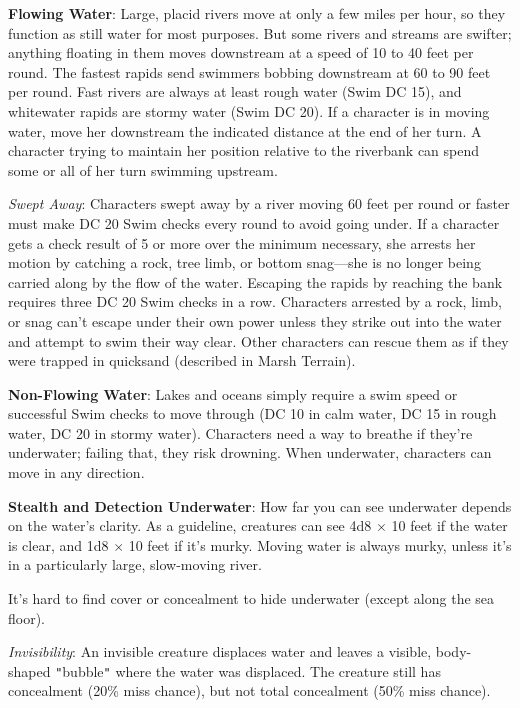 \textbf{Flowing Water}: Large, placid rivers move at only a few miles per hour, so they function as still water for most purposes. But some rivers and streams are swifter; anything floating in them moves downstream at a speed of 10 to 40 feet per round. The fastest rapids send swimmers bobbing downstream at 60 to 90 feet per round. Fast rivers are always at least rough water (Swim DC 15), and whitewater rapids are stormy water (Swim DC 20). If a character is in moving water, move her downstream the indicated distance at the end of her turn. A character trying to maintain her position relative to the riverbank can spend some or all of her turn swimming upstream.
				
\textit{Swept Away}: Characters swept away by a river moving 60 feet per round or faster must make DC 20 Swim checks every round to avoid going under. If a character gets a check result of 5 or more over the minimum necessary, she arrests her motion by catching a rock, tree limb, or bottom snag---she is no longer being carried along by the flow of the water. Escaping the rapids by reaching the bank requires three DC 20 Swim checks in a row. Characters arrested by a rock, limb, or snag can't escape under their own power unless they strike out into the water and attempt to swim their way clear. Other characters can rescue them as if they were trapped in quicksand (described in Marsh Terrain). 
				
\textbf{Non-Flowing Water}: Lakes and oceans simply require a swim speed or successful Swim checks to move through (DC 10 in calm water, DC 15 in rough water, DC 20 in stormy water). Characters need a way to breathe if they're underwater; failing that, they risk drowning. When underwater, characters can move in any direction.
				
\textbf{Stealth and Detection Underwater}: How far you can see underwater depends on the water's clarity. As a guideline, creatures can see 4d8 \mbox{$\times$} 10 feet if the water is clear, and 1d8 \mbox{$\times$} 10 feet if it's murky. Moving water is always murky, unless it's in a particularly large, slow-moving river.
				
It's hard to find cover or concealment to hide underwater (except along the sea floor).
				
\textit{Invisibility}: An invisible creature displaces water and leaves a visible, body-shaped \texttt{{}"{}}bubble\texttt{{}"{}} where the water was displaced. The creature still has concealment (20\% miss chance), but not total concealment (50\% miss chance).
				
